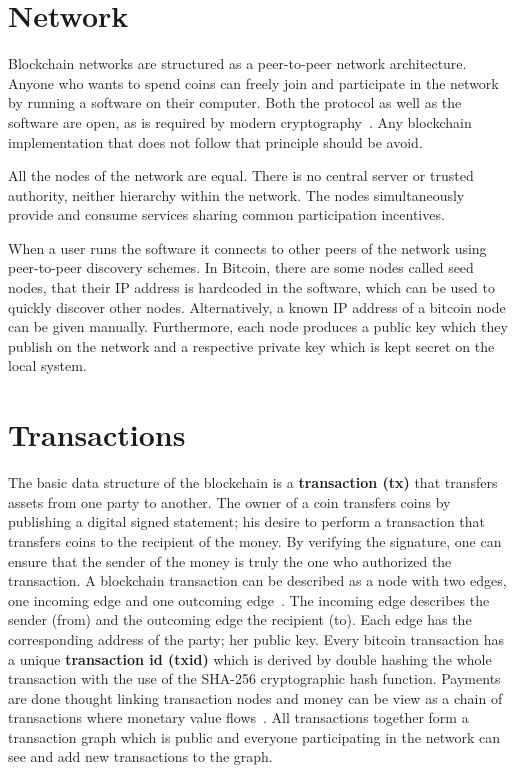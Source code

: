 \section{Network}\label{blockchain:network}

Blockchain networks are structured as a peer-to-peer network architecture. Anyone who wants to spend coins can freely join and participate in the network by running a software on their computer. Both the protocol as well as the software are open, as is required by modern cryptography~\cite{zindros_thesis}. Any blockchain implementation that does not follow that principle should be avoid.

All the nodes of the network are equal. There is no central server or trusted authority, neither hierarchy within the network. The nodes simultaneously provide and consume services sharing common participation incentives.

When a user runs the software it connects to other peers of the network using peer-to-peer discovery schemes. In Bitcoin, there are some nodes called seed nodes, that their IP address is hardcoded in the software, which can be used to quickly discover other nodes. Alternatively, a known IP address of a bitcoin node can be given manually. Furthermore, each node produces a public key which they publish on the network and a respective private key which is kept secret on the local system.

\section{Transactions}\label{blockchain:structure:tx}

The basic data structure of the blockchain is a \textbf{transaction (tx)} that transfers assets from one party to another. The owner of a coin transfers coins by publishing a digital signed statement; his desire to perform a transaction that transfers coins to the recipient of the money. By verifying the signature, one can ensure that the sender of the money is truly the one who authorized the transaction. A blockchain transaction can be described as a node with two edges, one incoming edge and one outcoming edge~\cite{zindros_thesis}. The incoming edge describes the sender (from) and the outcoming edge the recipient (to). Each edge has the corresponding address of the party; her public key. Every bitcoin transaction has a unique \textbf{transaction id (txid)} which is derived by double hashing the whole transaction with the use of the SHA-256 cryptographic hash function. Payments are done thought linking transaction nodes and money can be view as a chain of transactions where monetary value flows~\cite{zindros_thesis}. All transactions together form a transaction graph which is public and everyone participating in the network can see and add new transactions to the graph.

